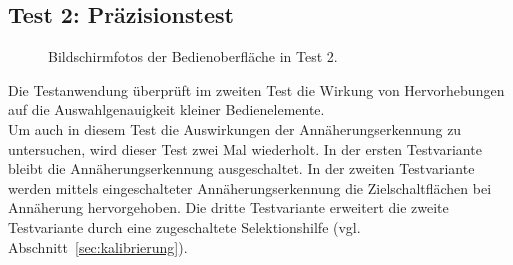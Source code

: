 \documentclass[12pt,numbers=noenddot,parskip,bibliography=totocnumbered,listof=totocnumbered]{scrreprt}
\begin{document}
\subsection{Test 2: Präzisionstest}
\begin{figure}
\centering
{}
\hfill
{}
\caption{Bildschirmfotos der Bedienoberfläche in Test 2.}
\label{test2screenshots}
\end{figure}
Die Testanwendung überprüft im zweiten Test die Wirkung von Hervorhebungen auf die Auswahlgenauigkeit kleiner Bedienelemente.\\
Um auch in diesem Test die Auswirkungen der Annäherungserkennung zu untersuchen, wird dieser Test zwei Mal wiederholt. In der ersten Testvariante bleibt die Annäherungserkennung ausgeschaltet. In der zweiten Testvariante werden mittels eingeschalteter Annäherungserkennung die Zielschaltflächen bei Annäherung hervorgehoben. Die dritte Testvariante erweitert die zweite Testvariante durch eine zugeschaltete Selektionshilfe (vgl. Abschnitt~\ref{sec:kalibrierung}).
\end{document}
